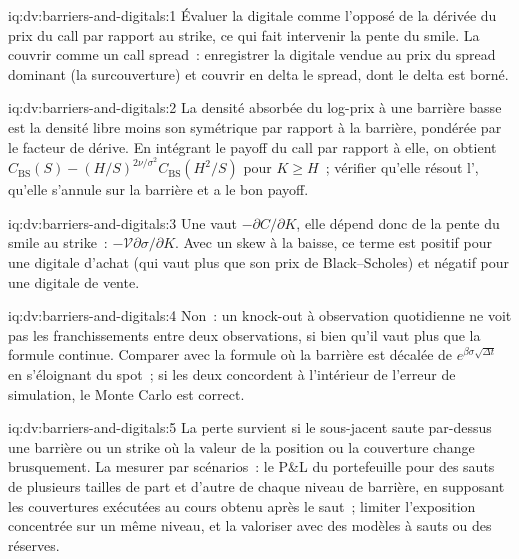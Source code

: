 \begin{solution}{iq:dv:barriers-and-digitals:1}
Évaluer la digitale comme l'opposé de la dérivée du prix du call par rapport au strike, ce qui fait intervenir la pente du smile. La couvrir comme un call spread~:
enregistrer la digitale vendue au prix du spread dominant (la surcouverture) et couvrir en delta le spread, dont le delta est
borné.
\end{solution}

\begin{solution}{iq:dv:barriers-and-digitals:2}
La densité absorbée du log-prix à une barrière basse est la densité libre moins son symétrique par rapport à la barrière, pondérée
par le facteur de dérive. En intégrant le payoff du call par rapport à elle, on obtient
$C_{\mathrm{BS}}(S)-(H/S)^{2\nu/\sigma^2}C_{\mathrm{BS}}(H^2/S)$ pour $K\ge H$~; vérifier qu'elle résout l', qu'elle s'annule
sur la barrière et a le bon payoff.
\end{solution}

\begin{solution}{iq:dv:barriers-and-digitals:3}
Une  vaut $-\partial C/\partial K$, elle dépend donc de la pente du smile au strike~: $-\mathcal V\partial\sigma/\partial K$.
Avec un skew à la baisse, ce terme est positif pour une digitale d'achat (qui vaut plus que son prix de Black--Scholes) et négatif pour une
digitale de vente.
\end{solution}

\begin{solution}{iq:dv:barriers-and-digitals:4}
Non~: un knock-out à observation quotidienne ne voit pas les franchissements entre deux observations, si bien qu'il vaut plus que la formule continue. Comparer
avec la formule où la barrière est décalée de $e^{\beta\sigma\sqrt{\Delta t}}$ en s'éloignant du spot~; si les deux concordent à l'intérieur de
l'erreur de simulation, le Monte Carlo est correct.
\end{solution}

\begin{solution}{iq:dv:barriers-and-digitals:5}
La perte survient si le sous-jacent saute par-dessus une barrière ou un strike où la valeur de la position ou la couverture change brusquement. La mesurer
par scénarios~: le P\&L du portefeuille pour des sauts de plusieurs tailles de part et d'autre de chaque niveau de barrière, en supposant les couvertures exécutées au
cours obtenu après le saut~; limiter l'exposition concentrée sur un même niveau, et la valoriser avec des modèles à sauts ou des réserves.
\end{solution}

